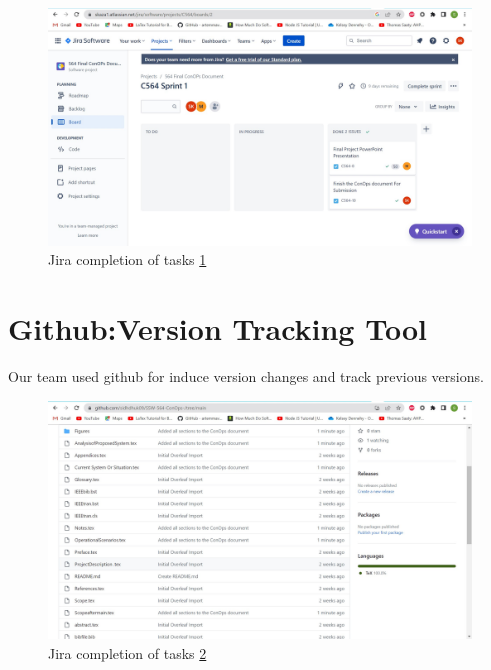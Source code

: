 \begin{figure}[H]
    \centering
    \includegraphics[scale=0.43]{Figures/All tasks completed.jpg}
    \caption{Jira completion of tasks \ref{fig::All tasks completed.jpg}}
    \label{fig::All tasks completed.jpg}
\end{figure}



\section{ Github:Version Tracking Tool \label{Github Version Tracking Tool} }

Our team used github for induce version changes and track previous versions. 

\begin{figure}[H]
    \centering
    \includegraphics[scale=0.43]{Figures/github update-1.jpg}
    \caption{Jira completion of tasks \ref{fig::github update-1.jpg}}
    \label{fig::github update-1.jpg}
\end{figure}